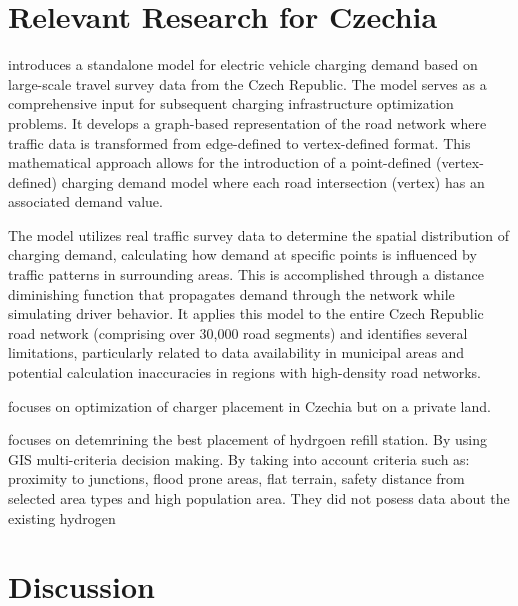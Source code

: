 \section{Relevant Research for Czechia}

 introduces a standalone model for electric vehicle charging demand based on large-scale travel survey data from the Czech Republic. The model serves as a comprehensive input for subsequent charging infrastructure optimization problems. It develops a graph-based representation of the road network where traffic data is transformed from edge-defined to vertex-defined format. This mathematical approach allows for the introduction of a point-defined (vertex-defined) charging demand model where each road intersection (vertex) has an associated demand value.

The model utilizes real traffic survey data to determine the spatial distribution of charging demand, calculating how demand at specific points is influenced by traffic patterns in surrounding areas. This is accomplished through a distance diminishing function that propagates demand through the network while simulating driver behavior. It applies this model to the entire Czech Republic road network (comprising over 30,000 road segments) and identifies several limitations, particularly related to data availability in municipal areas and potential calculation inaccuracies in regions with high-density road networks.

 focuses on optimization of charger placement in Czechia but on a private land.

 focuses on detemrining the best placement of hydrgoen refill station. By using GIS multi-criteria decision making.  By taking into account criteria such as: proximity to junctions, flood prone areas, flat terrain, safety distance from selected area types and high population area. They did not posess data about the existing hydrogen



\section{Discussion}

